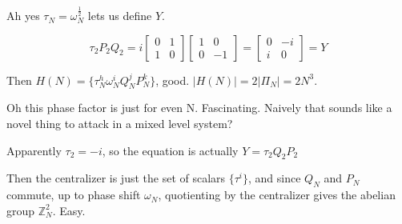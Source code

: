 \documentclass[]{article}
\newcommand{\ord}[1]{\left| #1 \right|}
\begin{document}
Ah yes $\tau_N = \omega_N^{\frac{1}{2}}$ lets us define $Y$.

\[\tau_2P_2Q_2 = i
\left[\begin{matrix}
0 & 1 \\
1 & 0
\end{matrix}\right]
\left[\begin{matrix}
1 & 0 \\
0 & -1
\end{matrix}\right]
=
\left[\begin{matrix}
	0 & -i \\
	i & 0
\end{matrix}\right]
= Y\]

Then $H(N) = \{\tau_N^h\omega_N^i Q_N^j P_N^k\}$, good. $\ord{H(N)}=2\ord{\Pi_N}=2N^3$.

Oh this phase factor is just for even N. Fascinating. Naively that sounds like a novel thing to attack in a mixed level system?

Apparently $\tau_2 = -i$, so the equation is actually $Y = \tau_2 Q_2 P_2$

Then the centralizer is just the set of scalars $\{\tau^i\}$, and since $Q_N$ and $P_N$ commute, up to phase shift $\omega_N$, quotienting by the centralizer gives the abelian group $\mathbb{Z}_N^2$. Easy.
\end{document}
